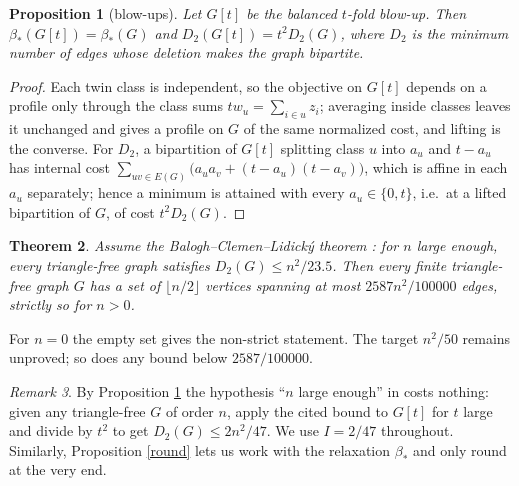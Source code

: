 \documentclass[11pt]{article}
\newtheorem{theorem}{Theorem}[section]
\newtheorem{proposition}[theorem]{Proposition}
\theoremstyle{remark}
\newtheorem{remark}[theorem]{Remark}
\newcommand{\bh}{\beta_*}
\begin{document}
\begin{proposition}[blow-ups]\label{blow}
Let $G[t]$ be the balanced $t$-fold blow-up. Then $\bh(G[t])=\bh(G)$ and
$D_2(G[t])=t^2D_2(G)$, where $D_2$ is the minimum number of edges whose
deletion makes the graph bipartite.
\end{proposition}
\begin{proof}
Each twin class is independent, so the objective on $G[t]$ depends on a
profile only through the class sums $t w_u=\sum_{i\in u}z_i$; averaging inside
classes leaves it unchanged and gives a profile on $G$ of the same normalized
cost, and lifting is the converse. For $D_2$, a bipartition of $G[t]$ splitting
class $u$ into $a_u$ and $t-a_u$ has internal cost
$\sum_{uv\in E(G)}\big(a_ua_v+(t-a_u)(t-a_v)\big)$, which is affine in each
$a_u$ separately; hence a minimum is attained with every $a_u\in\{0,t\}$, i.e.\
at a lifted bipartition of $G$, of cost $t^2D_2(G)$.
\end{proof}

\begin{theorem}\label{main}
Assume the Balogh--Clemen--Lidick\'y theorem \cite[Theorem~2(a)]{bcl}: for
$n$ large enough, every triangle-free graph satisfies $D_2(G)\le n^2/23.5$.
Then every finite triangle-free graph $G$ has a set of $\lfloor n/2\rfloor$
vertices spanning at most $2587n^2/100000$ edges, strictly so for $n>0$.
\end{theorem}
\noindent For $n=0$ the empty set gives the non-strict statement. The target
$n^2/50$ remains unproved; so does any bound below $2587/100000$.

\begin{remark}
By Proposition \ref{blow} the hypothesis ``$n$ large enough'' in \cite{bcl}
costs nothing: given any triangle-free $G$ of order $n$, apply the cited bound
to $G[t]$ for $t$ large and divide by $t^2$ to get $D_2(G)\le 2n^2/47$. We use
$I=2/47$ throughout. Similarly, Proposition \ref{round} lets us work with the
relaxation $\bh$ and only round at the very end.
\end{remark}
\end{document}
